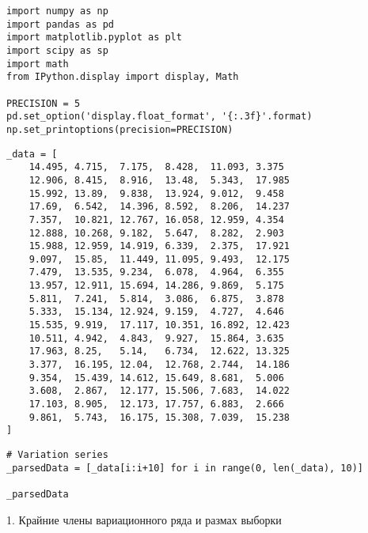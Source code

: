\documentclass[a4paper, 14pt]{extarticle}
\begin{document}
\vspace{20pt}




\lstset{style=mystyle, language=Python, extendedchars=\true}

\begin{lstlisting}
import numpy as np
import pandas as pd
import matplotlib.pyplot as plt
import scipy as sp
import math
from IPython.display import display, Math

PRECISION = 5
pd.set_option('display.float_format', '{:.3f}'.format)
np.set_printoptions(precision=PRECISION)
\end{lstlisting}

\begin{lstlisting}
_data = [
    14.495, 4.715,  7.175,  8.428,  11.093, 3.375
    12.906, 8.415,  8.916,  13.48,  5.343,  17.985
    15.992, 13.89,  9.838,  13.924, 9.012,  9.458
    17.69,  6.542,  14.396, 8.592,  8.206,  14.237
    7.357,  10.821, 12.767, 16.058, 12.959, 4.354
    12.888, 10.268, 9.182,  5.647,  8.282,  2.903
    15.988, 12.959, 14.919, 6.339,  2.375,  17.921
    9.097,  15.85,  11.449, 11.095, 9.493,  12.175
    7.479,  13.535, 9.234,  6.078,  4.964,  6.355
    13.957, 12.911, 15.694, 14.286, 9.869,  5.175
    5.811,  7.241,  5.814,  3.086,  6.875,  3.878
    5.333,  15.134, 12.924, 9.159,  4.727,  4.646
    15.535, 9.919,  17.117, 10.351, 16.892, 12.423
    10.511, 4.942,  4.843,  9.927,  15.864, 3.635
    17.963, 8.25,   5.14,   6.734,  12.622, 13.325
    3.377,  16.195, 12.04,  12.768, 2.744,  14.186
    9.354,  15.439, 14.612, 15.649, 8.681,  5.006
    3.608,  2.867,  12.177, 15.506, 7.683,  14.022
    17.103, 8.905,  12.173, 17.757, 6.883,  2.666
    9.861,  5.743,  16.175, 15.308, 7.039,  15.238
]
\end{lstlisting}

\begin{lstlisting}
# Variation series
_parsedData = [_data[i:i+10] for i in range(0, len(_data), 10)] 

_parsedData
\end{lstlisting}

\begin{center}
    1. Крайние члены вариационного ряда и размах выборки
\end{center}
\end{document}
